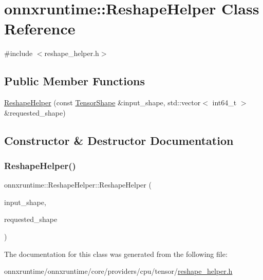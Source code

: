 \hypertarget{classonnxruntime_1_1ReshapeHelper}{}\section{onnxruntime\+:\+:Reshape\+Helper Class Reference}
\label{classonnxruntime_1_1ReshapeHelper}


{\ttfamily \#include $<$reshape\+\_\+helper.\+h$>$}

\subsection*{Public Member Functions}
\begin{DoxyCompactItemize}
\item 
\mbox{\hyperlink{classonnxruntime_1_1ReshapeHelper_a983e46a3013dd1e5f783700db3755de7}{Reshape\+Helper}} (const \mbox{\hyperlink{classonnxruntime_1_1TensorShape}{Tensor\+Shape}} \&input\+\_\+shape, std\+::vector$<$ int64\+\_\+t $>$ \&requested\+\_\+shape)
\end{DoxyCompactItemize}


\subsection{Constructor \& Destructor Documentation}
\mbox{\label{classonnxruntime_1_1ReshapeHelper_a983e46a3013dd1e5f783700db3755de7}} 
\subsubsection{\texorpdfstring{Reshape\+Helper()}{ReshapeHelper()}}
{\footnotesize\ttfamily onnxruntime\+::\+Reshape\+Helper\+::\+Reshape\+Helper (\begin{DoxyParamCaption}\item[{const \mbox{\hyperlink{classonnxruntime_1_1TensorShape}{Tensor\+Shape}} \&}]{input\+\_\+shape,  }\item[{std\+::vector$<$ int64\+\_\+t $>$ \&}]{requested\+\_\+shape }\end{DoxyParamCaption})\hspace{0.3cm}{\ttfamily [inline]}}



The documentation for this class was generated from the following file\+:\begin{DoxyCompactItemize}
\item 
onnxruntime/onnxruntime/core/providers/cpu/tensor/\mbox{\hyperlink{reshape__helper_8h}{reshape\+\_\+helper.\+h}}\end{DoxyCompactItemize}
